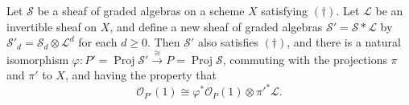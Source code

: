 Let $\mathcal{S}$ be a sheaf of graded algebras on a scheme $X$ satisfying $(\dagger)$. Let $\mathcal{L}$ be an invertible sheaf on $X$, and define a new sheaf of graded algebras $\mathcal{S}' = \mathcal{S} * \mathcal{L}$ by $\mathcal{S}'_d = \mathcal{S}_d \otimes \mathcal{L}^d$ for each $d \geqslant 0$. Then $\mathcal{S}'$ also satisfies $(\dagger)$, and there is a natural isomorphism $\varphi: P' = \operatorname{Proj} \mathcal{S}' \xrightarrow{\cong} P = \operatorname{Proj} \mathcal{S}$, commuting with the projections $\pi$ and $\pi'$ to $X$, and having the property that
$$\mathcal{O}_{P'}(1) \cong \varphi^*\mathcal{O}_P(1) \otimes \pi'^*\mathcal{L}.$$
